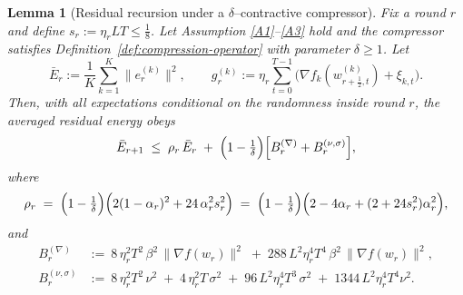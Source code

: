 \documentclass{article} %
\newtheorem{lemma}{Lemma}
\begin{document}
\begin{lemma}[Residual recursion under a $\delta$–contractive compressor]\label{lem:residual-A}
Fix a round $r$ and define $s_r:=\eta_r L T\le \tfrac18$. Let Assumption \ref{A1}--\ref{A3} hold and the compressor satisfies
Definition~\ref{def:compression-operator} with parameter $\delta\ge1$.
Let
\[
\bar E_r:=\frac1K\sum_{k=1}^K\|e_r^{(k)}\|^2,\qquad
g_r^{(k)}:=\eta_r\sum_{t=0}^{T-1}\bigl(\nabla f_k(w_{r+\frac12,t}^{(k)})+\xi_{k,t}\bigr).
\]
Then, with all expectations conditional on the randomness inside round $r$,
the averaged residual energy obeys
\begin{equation}\label{eq:resid-core}
\bar E_{r+1}\;\le\;\rho_r\,\bar E_r
\;+\;\Bigl(1-\tfrac1\delta\Bigr)\Bigl[B_r^{(\nabla)}+B_r^{(\nu,\sigma)}\Bigr],
\end{equation}
where
\[
\rho_r \;=\; \Bigl(1-\tfrac1\delta\Bigr)\Bigl(2(1-\alpha_r)^2+24\,\alpha_r^2 s_r^2\Bigr)
\;=\;\Bigl(1-\tfrac1\delta\Bigr)\Bigl(2-4\alpha_r+(2+24s_r^2)\alpha_r^2\Bigr),
\]
and
\[
\begin{aligned}
B_r^{(\nabla)}
&:=\ 8\,\eta_r^{2}T^{2}\,\beta^{2}\,\|\nabla f(w_r)\|^{2}
\;+\;288\,L^{2}\eta_r^{4}T^{4}\,\beta^{2}\,\|\nabla f(w_r)\|^{2},
\\[2pt]
B_r^{(\nu,\sigma)}
&:=\ 8\,\eta_r^{2}T^{2}\,\nu^{2}
\;+\;4\,\eta_r^{2}T\,\sigma^{2}
\;+\;96\,L^{2}\eta_r^{4}T^{3}\,\sigma^{2}
\;+\;1344\,L^{2}\eta_r^{4}T^{4}\nu^{2}.
\end{aligned}
\]
\end{lemma}
\end{document}
